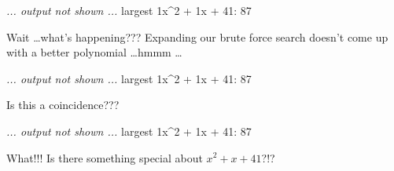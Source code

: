 \nextt
\begin{console}[frame=single, commandchars=\\\{\}]
\emph{... output not shown ...}
largest
    1x^2 +     1x +    41:    87
\end{console}
Wait \dots what's happening??? Expanding our brute force search doesn't come
up with a better polynomial \dots hmmm \dots

\nextt
\begin{console}[frame=single, commandchars=\\\{\}]
\emph{... output not shown ...}
largest
    1x^2 +     1x +    41:    87
\end{console}
Is this a coincidence???

\nextt
\begin{console}[frame=single, commandchars=\\\{\}]
\emph{... output not shown ...}
largest
    1x^2 +     1x +    41:    87
\end{console}
What!!! Is there something special about $x^2 + x + 41$?!?
